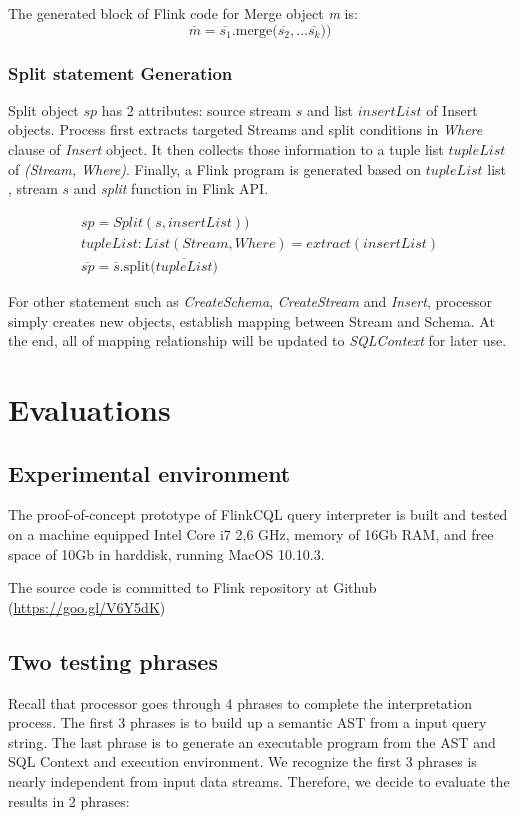 The generated block of Flink code for Merge object \textit{m} is:
\begin{equation}
	\overline{m} = \overline{s_1}\textrm{.merge(}\overline{s_2}, ...\overline{s_k} \textrm{))}
\end{equation}

\subsubsection*{Split statement Generation}

Split object $sp$ has 2 attributes: source stream $s$ and list $insertList$ of Insert objects. Process first extracts targeted Streams and split conditions in \textit{Where} clause  of \textit{Insert} object. It then collects those information to a tuple list $tupleList$ of \textit{(Stream, Where)}. Finally, a Flink program is generated based on $tupleList$ list ,  stream $s$ and \textit{split} function in Flink API.

\begin{align}
	sp = Split(s, insertList)) \\
	tupleList: List(Stream, Where) = extract(insertList) \\
	\overline{sp} = \overline{s}\textrm{.split(}\overline{tupleList})
\end{align}

For other statement such as \textit{CreateSchema}, \textit{CreateStream} and \textit{Insert}, processor simply creates new objects, establish mapping between Stream and Schema. At the end, all of mapping relationship will be updated to \textit{SQLContext} for later use.

\section{Evaluations}
\subsection*{Experimental environment}
The proof-of-concept prototype of FlinkCQL query interpreter is built and tested on a machine equipped Intel Core i7 2,6 GHz, memory of 16Gb RAM, and free space of 10Gb in harddisk, running MacOS 10.10.3.


The source code is committed to Flink repository at Github~ (\href{https://goo.gl/V6Y5dK}{https://goo.gl/V6Y5dK})


\subsection{Two testing phrases}
Recall that processor goes through 4 phrases to complete the interpretation process. The first 3 phrases is to build up a semantic AST from a input query string. The last phrase is to generate an executable program from the AST and SQL Context and execution environment. We recognize the first 3 phrases is nearly independent from input data streams.  Therefore, we decide to evaluate the results in 2 phrases:

